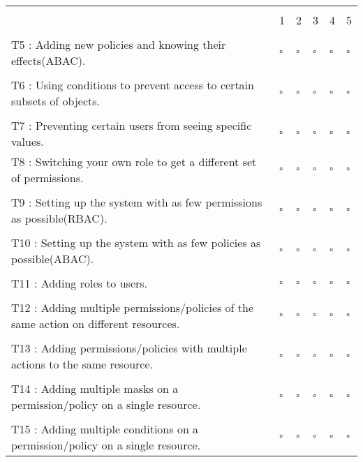 \hskip-2.8cm\begin{tabular}{p{8cm} p{1cm} p{1cm} p{1cm} p{1cm} p{1cm}}
    \multicolumn{6}{c}{} \\
    & 1 & 2 & 3 & 4 & 5 \\
    \\
    T5 : Adding new policies and knowing their effects(ABAC).
    & $\square$ & $\square$ & $\square$ & $\square$ & $\square$ \\
    \\
    T6 : Using conditions to prevent access to certain subsets of objects.
    & $\square$ & $\square$ & $\square$ & $\square$ & $\square$ \\
    \\
    T7 : Preventing certain users from seeing specific values.
     & $\square$ & $\square$ & $\square$ & $\square$ & $\square$
    \\
    T8 : Switching your own role to get a different set of permissions.
     & $\square$ & $\square$ & $\square$ & $\square$ & $\square$ \\
    \\
    T9 : Setting up the system with as few permissions as possible(RBAC).
     & $\square$ & $\square$ & $\square$ & $\square$ & $\square$ \\
    \\
     T10 : Setting up the system with as few policies as possible(ABAC).
     & $\square$ & $\square$ & $\square$ & $\square$ & $\square$ \\
    \\
    T11 : Adding roles to users.
     & $\square$ & $\square$ & $\square$ & $\square$ & $\square$ \\
    \\
    T12 : Adding multiple permissions/policies of the same action on different resources.
     & $\square$ & $\square$ & $\square$ & $\square$ & $\square$ \\
     \\
    T13 : Adding permissions/policies with multiple actions to the same resource.
     & $\square$ & $\square$ & $\square$ & $\square$ & $\square$ \\   
     \\
    T14 : Adding multiple masks on a permission/policy on a single resource.
     & $\square$ & $\square$ & $\square$ & $\square$ & $\square$ \\
     \\
    T15 : Adding multiple conditions on a permission/policy on a single resource.
     & $\square$ & $\square$ & $\square$ & $\square$ & $\square$ \\

\end{tabular}
